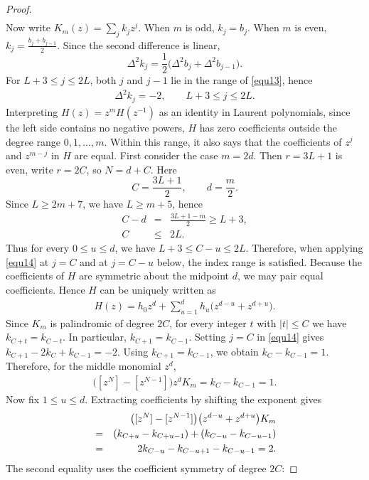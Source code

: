\documentclass[11pt,a4paper]{article}
\begin{document}
\begin{proof}
\begin{eqnarray}
\end{eqnarray}
Now write $K_m(z)=\sum_jk_jz^j$. When $m$ is odd, $k_j=b_j$. When $m$ is even, $k_j=\frac{b_j+b_{j-1}}2$. Since the second difference is linear,
\[
  \Delta^2k_j
  =\frac12\bigl(\Delta^2b_j+\Delta^2b_{j-1}\bigr).
\]
For $L+3\leq j\leq2L$, both $j$ and $j-1$ lie in the range of \eqref{equ13}, hence
\begin{eqnarray}\label{equ14}
  \Delta^2k_j=-2,
  \qquad L+3\leq j\leq 2L.
\end{eqnarray}
Interpreting $H(z)=z^mH(z^{-1})$ as an identity in Laurent polynomials, since the left side contains no negative powers, $H$ has zero coefficients outside the degree range $0,1,\ldots,m$. Within this range, it also says that the coefficients of $z^j$ and $z^{m-j}$ in $H$ are equal. First consider the case $m=2d$. Then $r=3L+1$ is even, write $r=2C$, so $N=d+C$. Here
\[
  C=\frac{3L+1}{2},\qquad d=\frac m2.
\]
Since $L\geq2m+7$, we have $L\geq m+5$, hence
\begin{eqnarray*}
  C-d&=&\frac{3L+1-m}{2}\geq L+3,\\
  C&\leq&2L.
\end{eqnarray*}
Thus for every $0\leq u\leq d$, we have $L+3\leq C-u\leq2L$. Therefore, when applying \eqref{equ14} at $j=C$ and at $j=C-u$ below, the index range is satisfied. Because the coefficients of $H$ are symmetric about the midpoint $d$, we may pair equal coefficients. Hence $H$ can be uniquely written as
\begin{eqnarray}\label{equ15}
  H(z)=h_0z^d+
  \sum_{u=1}^{d}h_u\bigl(z^{d-u}+z^{d+u}\bigr).
\end{eqnarray}
Since $K_m$ is palindromic of degree $2C$, for every integer $t$ with $|t|\leq C$ we have $k_{C+t}=k_{C-t}$. In particular, $k_{C+1}=k_{C-1}$. Setting $j=C$ in \eqref{equ14} gives $k_{C+1}-2k_C+k_{C-1}=-2$.
Using $k_{C+1}=k_{C-1}$, we obtain $k_C-k_{C-1}=1$. Therefore, for the middle monomial $z^d$,
\begin{eqnarray*}
  \bigl([z^N]-[z^{N-1}]\bigr)z^dK_m=k_C-k_{C-1}=1.
\end{eqnarray*}
Now fix $1\leq u\leq d$. Extracting coefficients by shifting the exponent gives
\begin{eqnarray*}
  &&\bigl([z^N]-[z^{N-1}]\bigr)
    \bigl(z^{d-u}+z^{d+u}\bigr)K_m\notag\\
  &=&(k_{C+u}-k_{C+u-1})
       +(k_{C-u}-k_{C-u-1})\notag\\
  &=&2k_{C-u}-k_{C-u+1}-k_{C-u-1}=2.
\end{eqnarray*}
The second equality uses the coefficient symmetry of degree $2C$:

\end{proof}
\end{document}
